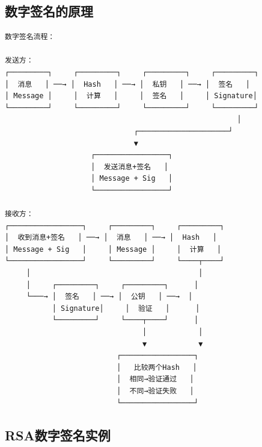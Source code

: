 \documentclass[12pt,a4paper]{article}
\begin{document}
\subsection{数字签名的原理}

\begin{lstlisting}
数字签名流程：

发送方：
┌─────────┐     ┌─────────┐     ┌─────────┐     ┌─────────┐
│  消息   │ ──→ │  Hash   │ ──→ │  私钥   │ ──→ │  签名   │
│ Message │     │  计算   │     │  签名   │     │ Signature│
└─────────┘     └─────────┘     └─────────┘     └─────────┘
                                                      │
                              ┌─────────────────────┘
                              ▼
                    ┌─────────────────┐
                    │  发送消息+签名   │
                    │ Message + Sig   │
                    └─────────────────┘

接收方：
┌─────────────────┐     ┌─────────┐     ┌─────────┐
│  收到消息+签名   │ ──→ │  消息   │ ──→ │  Hash   │
│ Message + Sig   │     │ Message │     │  计算   │
└─────────────────┘     └─────────┘     └────┬────┘
     │                                       │
     │     ┌─────────┐     ┌─────────┐      │
     └───→ │  签名   │ ──→ │  公钥   │ ──→  │
           │ Signature│     │  验证   │      │
           └─────────┘     └────┬────┘      │
                                │            │
                                ▼            ▼
                          ┌─────────────────┐
                          │   比较两个Hash   │
                          │  相同→验证通过   │
                          │  不同→验证失败   │
                          └─────────────────┘
\end{lstlisting}

\subsection{RSA数字签名实例}
\end{document}
